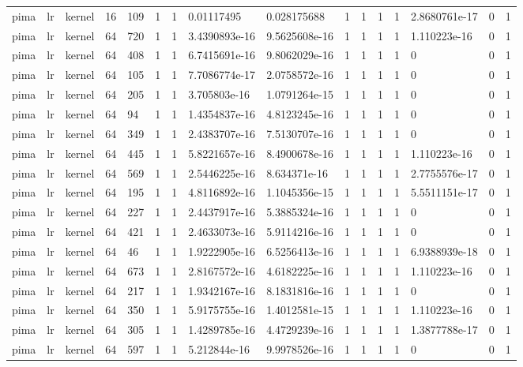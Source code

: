 \begin{tabular}{llllllllllllllll}
pima & lr & kernel & 16 & 109 & 1 & 1 & 0.01117495 & 0.028175688 & 1 & 1 & 1 & 1 & 2.8680761e-17 & 0 & 1 \\
pima & lr & kernel & 64 & 720 & 1 & 1 & 3.4390893e-16 & 9.5625608e-16 & 1 & 1 & 1 & 1 & 1.110223e-16 & 0 & 1 \\
pima & lr & kernel & 64 & 408 & 1 & 1 & 6.7415691e-16 & 9.8062029e-16 & 1 & 1 & 1 & 1 & 0 & 0 & 1 \\
pima & lr & kernel & 64 & 105 & 1 & 1 & 7.7086774e-17 & 2.0758572e-16 & 1 & 1 & 1 & 1 & 0 & 0 & 1 \\
pima & lr & kernel & 64 & 205 & 1 & 1 & 3.705803e-16 & 1.0791264e-15 & 1 & 1 & 1 & 1 & 0 & 0 & 1 \\
pima & lr & kernel & 64 & 94 & 1 & 1 & 1.4354837e-16 & 4.8123245e-16 & 1 & 1 & 1 & 1 & 0 & 0 & 1 \\
pima & lr & kernel & 64 & 349 & 1 & 1 & 2.4383707e-16 & 7.5130707e-16 & 1 & 1 & 1 & 1 & 0 & 0 & 1 \\
pima & lr & kernel & 64 & 445 & 1 & 1 & 5.8221657e-16 & 8.4900678e-16 & 1 & 1 & 1 & 1 & 1.110223e-16 & 0 & 1 \\
pima & lr & kernel & 64 & 569 & 1 & 1 & 2.5446225e-16 & 8.634371e-16 & 1 & 1 & 1 & 1 & 2.7755576e-17 & 0 & 1 \\
pima & lr & kernel & 64 & 195 & 1 & 1 & 4.8116892e-16 & 1.1045356e-15 & 1 & 1 & 1 & 1 & 5.5511151e-17 & 0 & 1 \\
pima & lr & kernel & 64 & 227 & 1 & 1 & 2.4437917e-16 & 5.3885324e-16 & 1 & 1 & 1 & 1 & 0 & 0 & 1 \\
pima & lr & kernel & 64 & 421 & 1 & 1 & 2.4633073e-16 & 5.9114216e-16 & 1 & 1 & 1 & 1 & 0 & 0 & 1 \\
pima & lr & kernel & 64 & 46 & 1 & 1 & 1.9222905e-16 & 6.5256413e-16 & 1 & 1 & 1 & 1 & 6.9388939e-18 & 0 & 1 \\
pima & lr & kernel & 64 & 673 & 1 & 1 & 2.8167572e-16 & 4.6182225e-16 & 1 & 1 & 1 & 1 & 1.110223e-16 & 0 & 1 \\
pima & lr & kernel & 64 & 217 & 1 & 1 & 1.9342167e-16 & 8.1831816e-16 & 1 & 1 & 1 & 1 & 0 & 0 & 1 \\
pima & lr & kernel & 64 & 350 & 1 & 1 & 5.9175755e-16 & 1.4012581e-15 & 1 & 1 & 1 & 1 & 1.110223e-16 & 0 & 1 \\
pima & lr & kernel & 64 & 305 & 1 & 1 & 1.4289785e-16 & 4.4729239e-16 & 1 & 1 & 1 & 1 & 1.3877788e-17 & 0 & 1 \\
pima & lr & kernel & 64 & 597 & 1 & 1 & 5.212844e-16 & 9.9978526e-16 & 1 & 1 & 1 & 1 & 0 & 0 & 1 \\

\end{tabular}
